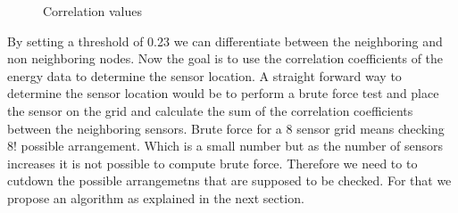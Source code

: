 \begin{figure}%
\centering

%
\label{fig:rawData}

\qquad
{}%
\label{fig:energyData}
\caption{Correlation values}
\end{figure}

By setting a threshold of 0.23 we can differentiate between the neighboring and non neighboring nodes. Now the goal is to use the correlation coefficients of the energy data to determine the sensor location. A straight forward way to determine the sensor location would be to perform a brute force test and place the sensor on the grid and calculate the sum of the correlation coefficients between the neighboring sensors. Brute force for a 8 sensor grid means checking 8! possible arrangement.  Which is a small number but as the number of sensors increases it is not possible to compute brute force. Therefore we need to to cutdown the possible arrangemetns that are supposed to be checked. For that we propose an algorithm as explained in the next section.

